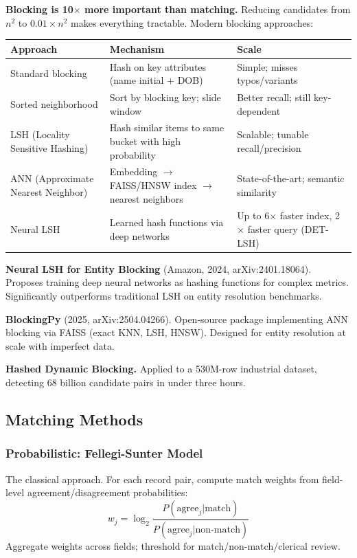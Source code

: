 \documentclass[11pt]{article}
\begin{document}
\textbf{Blocking is 10$\times$ more important than matching.} Reducing candidates from $n^2$ to $0.01 \times n^2$ makes everything tractable. Modern blocking approaches:

\begin{center}
\small
\begin{tabular}{p{3cm}p{4cm}p{4.5cm}}
\toprule
\textbf{Approach} & \textbf{Mechanism} & \textbf{Scale} \\
\midrule
Standard blocking & Hash on key attributes (name initial + DOB) & Simple; misses typos/variants \\
Sorted neighborhood & Sort by blocking key; slide window & Better recall; still key-dependent \\
LSH (Locality Sensitive Hashing) & Hash similar items to same bucket with high probability & Scalable; tunable recall/precision \\
ANN (Approximate Nearest Neighbor) & Embedding $\to$ FAISS/HNSW index $\to$ nearest neighbors & State-of-the-art; semantic similarity \\
Neural LSH & Learned hash functions via deep networks & Up to 6$\times$ faster index, 2$\times$ faster query (DET-LSH) \\
\bottomrule
\end{tabular}
\end{center}

\textbf{Neural LSH for Entity Blocking} (Amazon, 2024, arXiv:2401.18064). Proposes training deep neural networks as hashing functions for complex metrics. Significantly outperforms traditional LSH on entity resolution benchmarks.

\textbf{BlockingPy} (2025, arXiv:2504.04266). Open-source package implementing ANN blocking via FAISS (exact KNN, LSH, HNSW). Designed for entity resolution at scale with imperfect data.

\textbf{Hashed Dynamic Blocking.} Applied to a 530M-row industrial dataset, detecting 68 billion candidate pairs in under three hours.

\subsection{Matching Methods}

\subsubsection{Probabilistic: Fellegi-Sunter Model}

The classical approach. For each record pair, compute match weights from field-level agreement/disagreement probabilities:
\begin{equation*}
w_j = \log_2 \frac{P(\text{agree}_j | \text{match})}{P(\text{agree}_j | \text{non-match})}
\end{equation*}
Aggregate weights across fields; threshold for match/non-match/clerical review.
\end{document}
